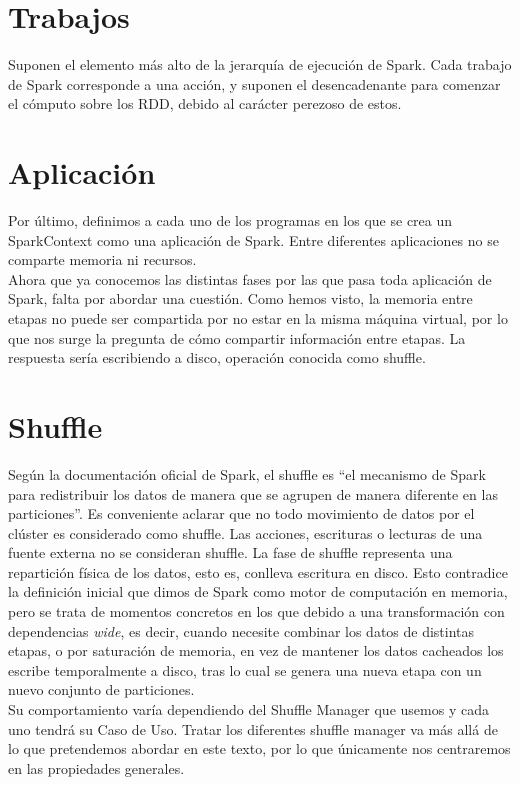 \section{Trabajos}
Suponen el elemento más alto de la jerarquía de ejecución de Spark. Cada trabajo de Spark corresponde a una acción, y suponen el desencadenante para comenzar el cómputo sobre los RDD, debido al carácter perezoso de estos. \\

\section{Aplicación}
Por último, definimos a cada uno de los programas en los que se crea un SparkContext como una aplicación de Spark. Entre diferentes aplicaciones no se comparte memoria ni recursos.\\

Ahora que ya conocemos las distintas fases por las que pasa toda aplicación de Spark, falta por abordar una cuestión. Como hemos visto, la memoria entre etapas no puede ser compartida por no estar en la misma máquina virtual, por lo que nos surge la pregunta de cómo compartir información entre etapas. La respuesta sería escribiendo a disco, operación conocida como shuffle.\\

\section{Shuffle}
Según la documentación oficial de Spark, el shuffle es “el mecanismo de Spark para redistribuir los datos de manera que se agrupen de manera diferente en las particiones”. Es conveniente aclarar que no todo movimiento de datos por el clúster es considerado como shuffle. Las acciones, escrituras o lecturas de una fuente externa no se consideran shuffle. La fase de shuffle representa una repartición física de los datos, esto es, conlleva escritura en disco. Esto contradice la definición inicial que dimos de Spark como  motor de computación en memoria, pero se trata de momentos concretos en los que debido a una transformación con dependencias \textit{wide}, es decir, cuando necesite combinar los datos de distintas etapas, o por saturación de memoria, en vez de mantener los datos cacheados los escribe temporalmente a disco, tras lo cual se genera una nueva etapa con un nuevo conjunto de particiones.\\

Su comportamiento varía dependiendo del Shuffle Manager que usemos y cada uno tendrá su Caso de Uso. Tratar los diferentes shuffle manager va más allá de lo que pretendemos abordar en este texto, por lo que únicamente nos centraremos en las propiedades generales.\\

